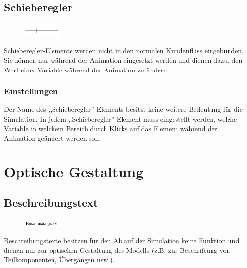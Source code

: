 \section{Schieberegler}
\label{ref:ModelElementInteractiveSlider}

\begin{figure}
\vspace{-22pt}
\includegraphics[width=2cm]{imageModelElementInteractiveSlider.png}
\vspace{-22pt}
\end{figure}

Schieberegler-Elemente werden nicht in den normalen Kundenfluss eingebunden.
Sie können nur während der Animation eingesetzt werden und dienen dazu,
den Wert einer Variable während der Animation zu ändern.

\subsection*{Einstellungen}

Der Name des ,,Schieberegler''-Elements besitzt keine weitere Bedeutung für die Simulation.
In jedem ,,Schieberegler''-Element muss eingestellt werden, welche Variable in welchem
Bereich durch Klicks auf das Element während der Animation geändert werden soll.





\chapter{Optische Gestaltung}

\section{Beschreibungstext}
\label{ref:ModelElementText}

\begin{figure}
\vspace{-22pt}
\includegraphics[width=2cm]{imageModelElementText.png}
\vspace{-22pt}
\end{figure}

Beschreibungstexte besitzen für den Ablauf der Simulation keine Funktion und dienen nur zur optischen Gestaltung des Modells
(z.B. zur Beschriftung von Teilkomponenten, Übergängen usw.).

